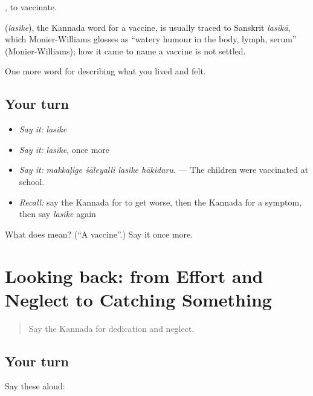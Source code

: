  , to vaccinate.

\begin{cousinweb}
\textbf{} (\emph{lasike}), the Kannada word for a vaccine, is usually traced to Sanskrit \emph{lasīkā}, which Monier-Williams glosses as \textquotedblleft{}watery humour in the body, lymph, serum\textquotedblright{} (Monier-Williams); how it came to name a vaccine is not settled.
\end{cousinweb}

\begin{grammarlens}[title={What you've built}]
One more word for describing what you lived and felt.
\end{grammarlens}

\subsection*{Your turn}
\begin{itemize}
\raggedright
  \item \emph{Say it:} \emph{lasike}
  \item \emph{Say it:} \emph{lasike}, once more
  \item \emph{Say it:} \emph{makkaḷige śāleyalli lasike hākidaru.} — The children were vaccinated at school.
  \item \emph{Recall:} say the Kannada for to get worse, then the Kannada for a symptom, then say \emph{lasike} again
\end{itemize}

\begin{tcolorbox}[breakable,colback=teal!4,colframe=teal!35!black,title={Before you move on}]
What does  mean? (\textquotedblleft{}A vaccine\textquotedblright{}.) Say it once more.
\end{tcolorbox}
\section[(dialogue)]{Looking back: from Effort and Neglect to Catching Something}

\label{lesson:KA-R511-review-505-511}



\begin{quote}
Say the Kannada for dedication and neglect.
\end{quote}

\subsection*{Your turn}
Say these aloud:

